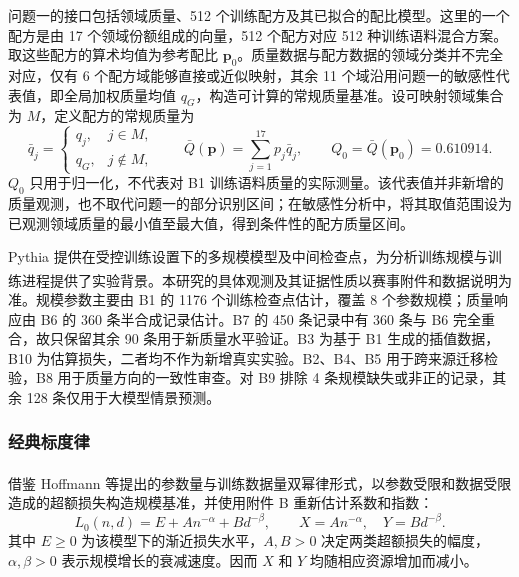 \documentclass[bwprint]{gmcmthesis}
\numberwithin{equation}{section}
\numberwithin{figure}{section}
\numberwithin{table}{section}
\begin{document}
        问题一的接口包括领域质量、512 个训练配方及其已拟合的配比模型。这里的一个配方是由 17 个领域份额组成的向量，512 个配方对应 512 种训练语料混合方案。取这些配方的算术均值为参考配比 $\bm p_0$。质量数据与配方数据的领域分类并不完全对应，仅有 6 个配方域能够直接或近似映射，其余 11 个域沿用问题一的敏感性代表值，即全局加权质量均值 $q_G$，构造可计算的常规质量基准。设可映射领域集合为 $M$，定义配方的常规质量为
        \begin{equation}
         \bar q_j=\begin{cases}q_j,&j\in M,\\q_G,&j\notin M,\end{cases}
         \qquad \bar Q(\bm p)=\sum_{j=1}^{17}p_j\bar q_j,
         \qquad Q_0=\bar Q(\bm p_0)=0.610914.
         \label{eq:p2_quality}
        \end{equation}
        $Q_0$ 只用于归一化，不代表对 B1 训练语料质量的实际测量。该代表值并非新增的质量观测，也不取代问题一的部分识别区间；在敏感性分析中，将其取值范围设为已观测领域质量的最小值至最大值，得到条件性的配方质量区间。
        
        Pythia 提供在受控训练设置下的多规模模型及中间检查点，为分析训练规模与训练进程提供了实验背景\textsuperscript{\cite{biderman2023pythia}}。本研究的具体观测及其证据性质以赛事附件和数据说明为准。规模参数主要由 B1 的 1176 个训练检查点估计，覆盖 8 个参数规模；质量响应由 B6 的 360 条半合成记录估计。B7 的 450 条记录中有 360 条与 B6 完全重合，故只保留其余 90 条用于新质量水平验证。B3 为基于 B1 生成的插值数据，B10 为估算损失，二者均不作为新增真实实验。B2、B4、B5 用于跨来源迁移检验，B8 用于质量方向的一致性审查。对 B9 排除 4 条规模缺失或非正的记录，其余 128 条仅用于大模型情景预测。
    
        \subsubsection{经典标度律}  %
        借鉴 Hoffmann 等提出的参数量与训练数据量双幂律形式\textsuperscript{\cite{hoffmann2022chinchilla}}，以参数受限和数据受限造成的超额损失构造规模基准，并使用附件 B 重新估计系数和指数：
        \begin{equation}
         L_0(n,d)=E+A n^{-\alpha}+B d^{-\beta},\qquad
         X=A n^{-\alpha},\quad Y=B d^{-\beta}.
         \label{eq:p2_baseline}
        \end{equation}
        其中 $E\geq0$ 为该模型下的渐近损失水平，$A,B>0$ 决定两类超额损失的幅度，$\alpha,\beta>0$ 表示规模增长的衰减速度。因而 $X$ 和 $Y$ 均随相应资源增加而减小。
        
\end{document}
